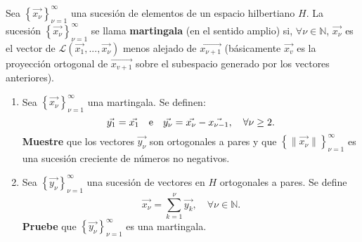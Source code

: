 \documentclass[12pt]{report}
\newcounter{it}
\theoremstyle{largebreak}
\newcommand\norm[1]{\ensuremath{\|#1\|}}
\begin{document}
    \begin{excer}
        Sea $\left\{\vec{x_\nu} \right\}_{\nu=1}^\infty$ una sucesión de elementos de un espacio hilbertiano $H$. La sucesión $\left\{\vec{x_\nu} \right\}_{\nu=1}^\infty$ se llama \textbf{martingala} (en el sentido amplio) si, $\forall\nu\in\mathbb{N}$, $\vec{x_\nu}$ es el vector de $\mathcal{L}(\vec{x_1},...,\vec{x_\nu})$ menos alejado de $\vec{x_{\nu+1}}$ (básicamente $\vec{x_v}$ es la proyección ortogonal de $\vec{x_{v+1}}$ sobre el subespacio generado por los vectores anteriores).
        \begin{enumerate}
            \item Sea $\left\{\vec{x_\nu} \right\}_{\nu=1}^\infty$ una martingala. Se definen:
            \begin{equation*}
                \vec{y_1}=\vec{x_1}\quad\textup{e}\quad\vec{y_\nu}=\vec{x_\nu}-\vec{x_{\nu-1}},\quad\forall\nu\geq2.
            \end{equation*}
            \textbf{Muestre} que los vectores $\vec{y_\nu}$ son ortogonales a pares y que $\left\{\norm{\vec{x_\nu}} \right\}_{\nu=1}^\infty$ es una sucesión creciente de números no negativos.
            \item Sea $\left\{\vec{y_\nu} \right\}_{\nu=1}^\infty$ una sucesión de vectores en $H$ ortogonales a pares. Se define
            \begin{equation*}
                \vec{x_\nu}=\sum_{k=1}^\nu\vec{y_k},\quad\forall\nu\in\mathbb{N}.
            \end{equation*}
            \textbf{Pruebe} que $\left\{\vec{y_\nu} \right\}_{\nu=1}^\infty$ es una martingala.
        \end{enumerate}
    \end{excer}
\end{document}
